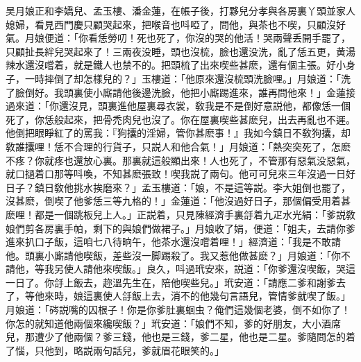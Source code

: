 吴月娘正和李嬌兒、孟玉樓、潘金蓮，在帳子後，打夥兒分孝與各房裏丫頭並家人媳婦，看見西門慶只顧哭起來，把喉音也呌啞了，問他，與茶也不喫，只顧沒好氣。月娘便道：「你看恁勞叨！死也死了，你沒的哭的他活！哭兩聲丢開手罷了，只顧扯長絆兒哭起來了！三兩夜没睡，頭也沒梳，臉也還没洗，亂了恁五更，黄湯辣水還沒嚐着，就是鐵人也禁不的。把頭梳了出來喫些甚麽，還有個主張。好小身子，一時摔倒了却怎樣兒的？」玉樓道：「他原來還沒梳頭洗臉哩。」月娘道：「洗了臉倒好。我頭裏使小廝請他後邊洗臉，他把小廝踢進來，誰再問他來！」金蓮接過來道：「你還沒見，頭裏進他屋裏尋衣裳，敎我是不是倒好意説他，都像恁一個死了，你恁般起來，把骨禿肉兒也沒了。你在屋裏喫些甚麽兒，出去再亂也不遲。他倒把眼睜紅了的罵我：『狗攮的淫婦，管你甚麽事！』我如今鎮日不敎狗攮，却敎誰攮哩！恁不合理的行貨子，只説人和他合氣！」月娘道：「熱突突死了，怎麽不疼？你就疼也還放心裏。那裏就這般顯出來！人也死了，不管那有惡氣没惡氣，就口撾着口那等呌喚，不知甚麽張致！喫我説了兩句。他可可兒來三年沒過一日好日子？鎮日敎他挑水挨磨來？」孟玉樓道：「娘，不是這等説。李大姐倒也罷了，沒甚麽，倒喫了他爹恁三等九格的！」金蓮道：「他沒過好日子，那個偏受用着甚麽哩！都是一個跳板兒上人。」正説着，只見陳經濟手裏㧱着九疋水光絹：「爹説敎娘們剪各房裏手帕，剩下的與娘們做裙子。」月娘收了娟，便道：「姐夫，去請你爹進來扒口子飯，這咱七八待晌午，他茶水還沒嚐着哩！」經濟道：「我是不敢請他。頭裏小廝請他喫飯，差些沒一脚踢殺了。我又惹他做甚麽？」月娘道：「你不請他，等我另使人請他來喫飯。」良久，呌過玳安來，説道：「你爹還沒喫飯，哭這一日了。你㧱上飯去，趂溫先生在，陪他喫些兒。」玳安道：「請應二爹和謝爹去了，等他來時，娘這裏使人㧱飯上去，消不的他幾句言語兒，管情爹就喫了飯。」月娘道：「硶説嘴的囚根子！你是你爹肚裏蛔虫？俺們這幾個老婆，倒不如你了！你怎的就知道他兩個來纔喫飯？」玳安道：「娘們不知，爹的好朋友，大小酒席兒，那遭少了他兩個？爹三錢，他也是三錢，爹二星，他也是二星。爹隨問怎的着了惱，只他到，略説兩句話兒，爹就眉花眼笑的。」

